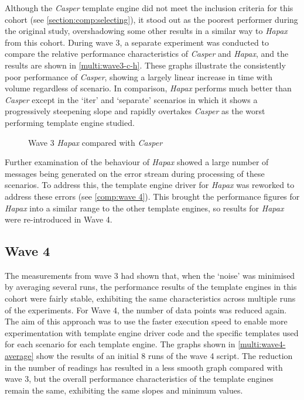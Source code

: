 Although the \emph{Casper} template engine did not meet the inclusion criteria for this cohort (see \autoref{section:comp:selecting}), it stood out as the poorest performer during the original study, overshadowing some other results in a similar way to \emph{Hapax} from this cohort. During wave 3, a separate experiment was conducted to compare the relative performance characteristics of \emph{Casper} and \emph{Hapax}, and the results are shown in \autoref{multi:wave3-c-h}. These graphs illustrate the consistently poor performance of \emph{Casper}, showing a largely linear increase in time with volume regardless of scenario. In comparison, \emph{Hapax} performs much better than \emph{Casper} except in the `iter' and `separate' scenarios in which it shows a progressively steepening slope and rapidly overtakes \emph{Casper} as the worst performing template engine studied.

\begin{figure}[ht!]
\centering

\caption{\label{multi:wave3-c-h}Wave 3 \emph{Hapax} compared with \emph{Casper}}
\end{figure}

Further examination of the behaviour of \emph{Hapax} showed a large number of messages being generated on the error stream during processing of these scenarios. To address this, the template engine driver for \emph{Hapax} was reworked to address these errors (see \autoref{comp:wave 4}). This brought the performance figures for \emph{Hapax} into a similar range to the other template engines, so results for \emph{Hapax} were re-introduced in Wave 4. 


\subsection{Wave 4}
\label{comp:wave 4}

The measurements from wave 3 had shown that, when the `noise' was minimised by averaging several runs, the performance results of the template engines in this cohort were fairly stable, exhibiting the same characteristics across multiple runs of the experiments. For Wave 4, the number of data points was reduced again. The aim of this approach was to use the faster execution speed to enable more experimentation with template engine driver code and the specific templates used for each scenario for each template engine. The graphs shown in \autoref{multi:wave4-average} show the results of an initial 8 runs of the wave 4 script. The reduction in the number of readings has resulted in a less smooth graph compared with wave 3, but the overall performance characteristics of the template engines remain the same, exhibiting the same slopes and minimum values.

